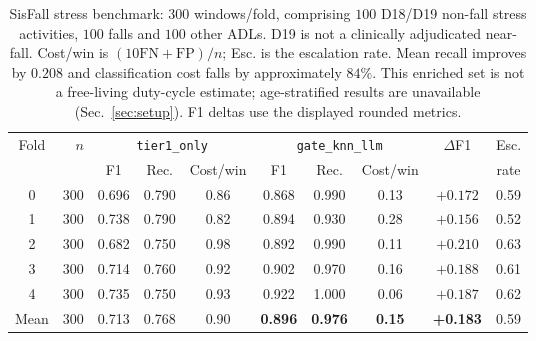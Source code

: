 \begin{table}[!t]
\centering
\caption{SisFall stress benchmark: $300$ windows/fold, comprising $100$ D18/D19 non-fall stress activities, $100$ falls and $100$ other ADLs. D19 is not a clinically adjudicated near-fall. Cost/win is $(10\mathrm{FN}+\mathrm{FP})/n$; Esc. is the escalation rate. Mean recall improves by $0.208$ and classification cost falls by approximately $84\%$. This enriched set is not a free-living duty-cycle estimate; age-stratified results are unavailable (Sec.~\ref{sec:setup}). F1 deltas use the displayed rounded metrics.}
\label{tab:ambiguoussisfall}
\begin{tabular}{c r ccc ccc cc}
\toprule
Fold & $n$ & \multicolumn{3}{c}{\texttt{tier1\_only}} & \multicolumn{3}{c}{\texttt{gate\_knn\_llm}} & $\Delta$F1 & Esc. \\
\cmidrule(lr){3-5}\cmidrule(lr){6-8}
 & & F1 & Rec. & Cost/win & F1 & Rec. & Cost/win & & rate \\
\midrule
0 & 300 & 0.696 & 0.790 & 0.86 & 0.868 & 0.990 & 0.13 & $+0.172$ & 0.59 \\
1 & 300 & 0.738 & 0.790 & 0.82 & 0.894 & 0.930 & 0.28 & $+0.156$ & 0.52 \\
2 & 300 & 0.682 & 0.750 & 0.98 & 0.892 & 0.990 & 0.11 & $+0.210$ & 0.63 \\
3 & 300 & 0.714 & 0.760 & 0.92 & 0.902 & 0.970 & 0.16 & $+0.188$ & 0.61 \\
4 & 300 & 0.735 & 0.750 & 0.93 & 0.922 & 1.000 & 0.06 & $+0.187$ & 0.62 \\
\midrule
Mean & 300 & 0.713 & 0.768 & 0.90 & \textbf{0.896} & \textbf{0.976} & \textbf{0.15} & \textbf{+0.183} & 0.59 \\
\bottomrule
\end{tabular}
\end{table}
